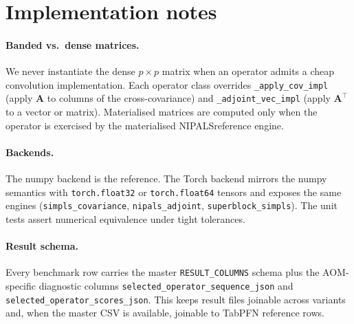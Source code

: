 \documentclass[a4paper,11pt]{article}
\newcommand{\Amat}{\mathbf{A}}
\newcommand{\NIPALS}{\textsc{NIPALS}}
\begin{document}
\section{Implementation notes}\label{app:impl}

\paragraph{Banded vs.\ dense matrices.}
We never instantiate the dense $p\times p$ matrix when an operator
admits a cheap convolution implementation. Each operator class
overrides \verb|_apply_cov_impl| (apply $\Amat$ to columns of the
cross-covariance) and \verb|_adjoint_vec_impl| (apply $\Amat^\top$ to a
vector or matrix). Materialised matrices are computed only when the
operator is exercised by the materialised \NIPALS reference engine.

\paragraph{Backends.}
The numpy backend is the reference. The Torch backend mirrors the
numpy semantics with \verb|torch.float32| or \verb|torch.float64|
tensors and exposes the same engines (\verb|simpls_covariance|,
\verb|nipals_adjoint|, \verb|superblock_simpls|). The unit tests
assert numerical equivalence under tight tolerances.

\paragraph{Result schema.}
Every benchmark row carries the master \verb|RESULT_COLUMNS| schema
plus the AOM-specific diagnostic columns
\verb|selected_operator_sequence_json| and
\verb|selected_operator_scores_json|. This keeps result files
joinable across variants and, when the master CSV is available,
joinable to TabPFN reference rows.



\end{document}
